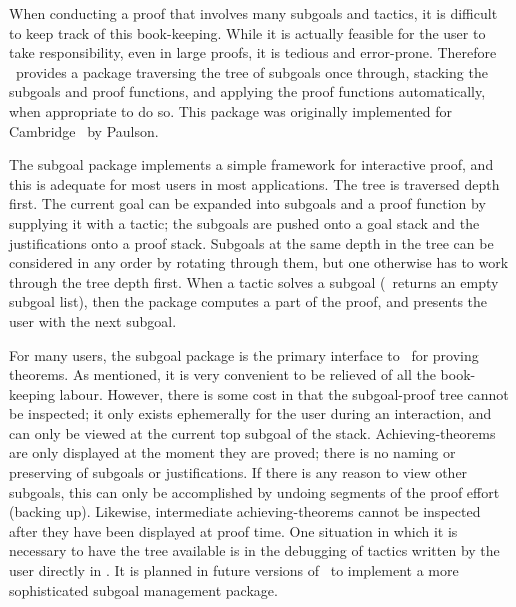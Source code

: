 When conducting a proof that involves many subgoals and tactics,
it is difficult
to keep track of this book-keeping.
While it is actually feasible for the user to take responsibility,
even in large proofs, it is tedious and error-prone.
Therefore \HOL\ provides a package
traversing the tree of subgoals once through, stacking the subgoals
and proof functions, and applying the proof functions
automatically, when appropriate
to do so.
This package was originally implemented for Cambridge \LCF\ by
 Paulson.

The subgoal package implements a simple framework for interactive proof,
and this is adequate for most users in most applications.
The tree is traversed depth first.  The current goal can be expanded
into subgoals and a proof function by supplying it with a tactic;
the subgoals are pushed onto a goal
stack
 and the justifications onto a proof stack.
Subgoals  at the same depth in the tree
can be considered in any order by rotating
 through them, but one
otherwise has to work through the tree depth first.
When a tactic solves a
subgoal (\ie\ returns an empty subgoal list), then the package computes
a part of the proof, and presents the user with the next subgoal.

For many users, the subgoal package
 is the
primary interface to \HOL\ for proving theorems.  As mentioned, it is
very convenient to be relieved of all the book-keeping labour.
However, there is some cost in that the subgoal-proof tree
 cannot be inspected;
it only exists ephemerally for the user during an interaction,
and can only be viewed at the current top subgoal of the stack.
Achieving-theorems are only displayed at the moment they are proved;
there is no naming or preserving of subgoals or justifications.
If there is any reason to view
other subgoals, this can only be accomplished by undoing segments of
the proof effort (backing up). Likewise, intermediate achieving-theorems
cannot be inspected after they have been displayed at proof time.  One
situation in which it is necessary
to have the tree available is in the debugging
 of tactics written
by the user directly in \ML. It is planned in future versions of
\HOL\ to implement a more sophisticated subgoal management package.

